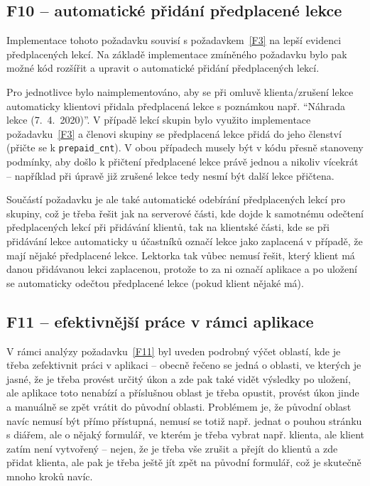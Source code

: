 \subsection{F10 -- automatické přidání předplacené lekce}

Implementace tohoto požadavku souvisí s požadavkem~\ref{F3} na lepší evidenci předplacených lekcí. Na základě implementace zmíněného požadavku bylo pak možné kód rozšířit a upravit o automatické přidání předplacených lekcí.

Pro jednotlivce bylo naimplementováno, aby se při omluvě klienta/zrušení lekce automaticky klientovi přidala předplacená lekce s poznámkou např. \enquote{Náhrada lekce (7.~4.~2020)}. V případě lekcí skupin bylo využito implementace požadavku~\ref{F3} a členovi skupiny se předplacená lekce přidá do jeho členství (přičte se k \verb|prepaid_cnt|). V obou případech musely být v kódu přesně stanoveny podmínky, aby došlo k přičtení předplacené lekce právě jednou a nikoliv vícekrát -- například při úpravě již zrušené lekce tedy nesmí být další lekce přičtena.

Součástí požadavku je ale také automatické odebírání předplacených lekcí pro skupiny, což je třeba řešit jak na serverové části, kde dojde k samotnému odečtení předplacených lekcí při přidávání klientů, tak na klientské části, kde se při přidávání lekce automaticky u účastníků označí lekce jako zaplacená v případě, že mají nějaké předplacené lekce. Lektorka tak vůbec nemusí řešit, který klient má danou přidávanou lekci zaplacenou, protože to za ni označí aplikace a po uložení se automaticky odečtou předplacené lekce (pokud klient nějaké má).

\subsection{F11 -- efektivnější práce v rámci aplikace}

V rámci analýzy požadavku~\ref{F11} byl uveden podrobný výčet oblastí, kde je třeba zefektivnit práci v aplikaci -- obecně řečeno se jedná o oblasti, ve kterých je jasné, že je třeba provést určitý úkon a zde pak také vidět výsledky po uložení, ale aplikace toto nenabízí a příslušnou oblast je třeba opustit, provést úkon jinde a manuálně se zpět vrátit do původní oblasti. Problémem je, že původní oblast navíc nemusí být přímo přístupná, nemusí se totiž např. jednat o pouhou stránku s diářem, ale o nějaký formulář, ve kterém je třeba vybrat např. klienta, ale klient zatím není vytvořený -- nejen, že je třeba vše zrušit a přejít do klientů a zde přidat klienta, ale pak je třeba ještě jít zpět na původní formulář, což je skutečně mnoho kroků navíc.

